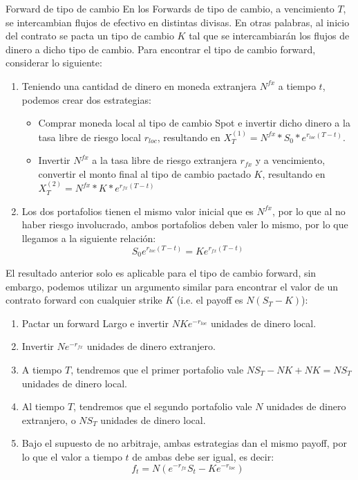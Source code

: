 \documentclass[11pt]{beamer}
\begin{document}
\begin{frame}{Forward de tipo de cambio}
	En los Forwards de tipo de cambio, a vencimiento $T$, se intercambian flujos de efectivo en distintas divisas. En otras palabras, al inicio del contrato se pacta un tipo de cambio $K$ tal que se intercambiarán los flujos de dinero a dicho tipo de cambio. Para encontrar el tipo de cambio forward, considerar lo siguiente:
	\begin{enumerate}
		\item Teniendo una cantidad de dinero en moneda extranjera $N^{fx}$ a tiempo $t$, podemos crear dos estrategias:
		\begin{itemize}
			\item Comprar moneda local al tipo de cambio Spot e invertir dicho dinero a la tasa libre de riesgo local $r_{loc}$, resultando en $X_T^{(1)}=N^{fx}*S_0* e^{r_{loc}(T-t)}$.
			\item Invertir $N^{fx}$ a la tasa libre de riesgo extranjera $r_{fx}$ y a vencimiento, convertir el monto final al tipo de cambio pactado $K$, resultando en $X_T^{(2)}=N^{fx}*K* e^{r_{fx}(T-t)}$
		\end{itemize}
	\item Los dos portafolios tienen el mismo valor inicial que es $N^{fx}$, por lo que al no haber riesgo involucrado, ambos portafolios deben valer lo mismo, por lo que llegamos a la siguiente relación:
	\begin{equation}
	S_0 e^{r_{loc}(T-t)}=K e^{r_{fx}(T-t)}
	\end{equation}
	\end{enumerate}
\end{frame}
\begin{frame}{{}}
	El resultado anterior solo es aplicable para el tipo de cambio forward, sin embargo, podemos utilizar un argumento similar para encontrar el valor de un contrato forward con cualquier strike $K$ (i.e. el payoff es $N(S_T-K)$):
	\begin{enumerate}
		\item Pactar un forward Largo e invertir $NKe^{-r_{loc}}$ unidades de dinero local. 
		\item Invertir $Ne^{-r_{fx}}$ unidades de dinero extranjero.
		\item A tiempo $T$, tendremos que el primer portafolio vale $NS_T-NK+NK=NS_T$ unidades de dinero local.
		\item Al tiempo $T$, tendremos que el segundo portafolio vale $N$ unidades de dinero extranjero, o $NS_T$ unidades de dinero local.
		\item Bajo el supuesto de no arbitraje, ambas estrategias dan el mismo payoff, por lo que el valor a tiempo $t$ de ambas debe ser igual, es decir:
		\begin{equation}
		f_t=N(e^{-r_{fx}}S_t-Ke^{-r_{loc}})
		\end{equation}
	\end{enumerate}
\end{frame}
\end{document}
